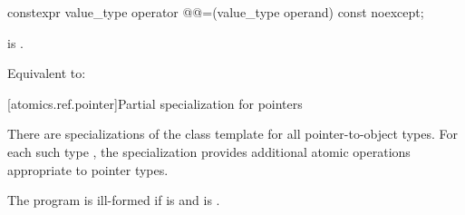 %
%
\begin{itemdecl}
constexpr value_type operator @@=(value_type operand) const noexcept;
\end{itemdecl}

\begin{itemdescr}
\pnum
\constraints
{} is .

\pnum
\effects
Equivalent to:
\end{itemdescr}

[atomics.ref.pointer]{Partial specialization for pointers}
%

\pnum
There are specializations of the  class template
for all pointer-to-object types.
For each such type ,
the specialization  provides
additional atomic operations appropriate to pointer types.

\pnum
The program is ill-formed
if  is  and
 is .

